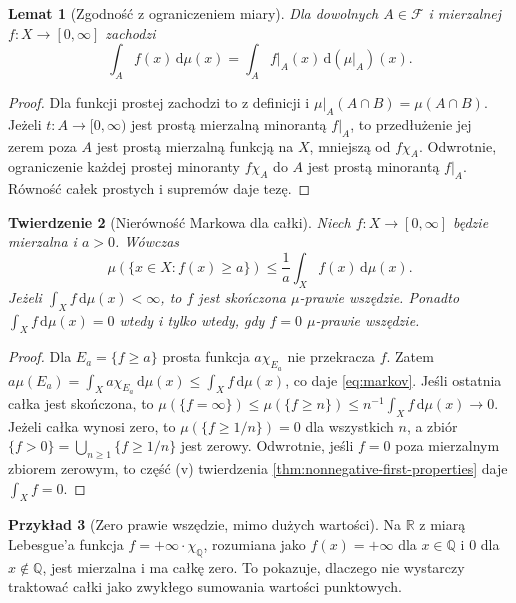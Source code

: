 \documentclass[11pt,a4paper,oneside]{book}
\numberwithin{equation}{chapter}
\theoremstyle{plain}
\newtheorem{twierdzenie}{Twierdzenie}[chapter]
\newtheorem{lemat}[twierdzenie]{Lemat}
\theoremstyle{definition}
\newtheorem{przyklad}[twierdzenie]{Przykład}
\theoremstyle{remark}
\begin{document}
\begin{lemat}[Zgodność z ograniczeniem miary]
\label{lem:restriction-integral}
Dla dowolnych $A\in\mathcal F$ i mierzalnej
$f:X\to[0,\infty]$ zachodzi
\[
\int_A f(x)\,\mathrm d\mu(x)
=\int_A f|_A(x)\,\mathrm d(\mu|_A)(x).
\]
\end{lemat}
\begin{proof}
Dla funkcji prostej zachodzi to z definicji i
$\mu|_A(A\cap B)=\mu(A\cap B)$.
Jeżeli $t:A\to[0,\infty)$ jest prostą mierzalną
minorantą $f|_A$, to przedłużenie jej zerem poza $A$
jest prostą mierzalną funkcją na $X$, mniejszą od
$f\chi_A$. Odwrotnie, ograniczenie każdej
prostej minoranty $f\chi_A$ do $A$ jest
prostą minorantą $f|_A$. Równość całek prostych
i supremów daje tezę.
\end{proof}

\begin{twierdzenie}[Nierówność Markowa dla całki]
\label{thm:markov-nonnegative}
Niech $f:X\to[0,\infty]$ będzie mierzalna i $a>0$.
Wówczas
\begin{equation}\label{eq:markov}
\mu(\{x\in X:f(x)\ge a\})
\le \frac1a\int_X f(x)\,\mathrm d\mu(x).
\end{equation}
Jeżeli $\int_Xf\,\mathrm d\mu(x)<\infty$, to $f$ jest
skończona $\mu$-prawie wszędzie. Ponadto
$\int_Xf\,\mathrm d\mu(x)=0$ wtedy i tylko wtedy,
gdy $f=0$ $\mu$-prawie wszędzie.
\end{twierdzenie}
\begin{proof}
Dla $E_a=\{f\ge a\}$ prosta funkcja
$a\chi_{E_a}$ nie przekracza $f$. Zatem
$a\mu(E_a)=\int_X a\chi_{E_a}\,\mathrm d\mu(x)
\le\int_Xf\,\mathrm d\mu(x)$, co daje
\eqref{eq:markov}. Jeśli ostatnia całka jest skończona,
to $\mu(\{f=\infty\})\le\mu(\{f\ge n\})
\le n^{-1}\int_Xf\,\mathrm d\mu(x)\to0$.
Jeżeli całka wynosi zero, to
$\mu(\{f\ge 1/n\})=0$ dla wszystkich $n$, a zbiór
$\{f>0\}=\bigcup_{n\ge1}\{f\ge1/n\}$ jest zerowy.
Odwrotnie, jeśli $f=0$ poza mierzalnym zbiorem zerowym,
to część (v) twierdzenia
\ref{thm:nonnegative-first-properties} daje $\int_X f=0$.
\end{proof}

\begin{przyklad}[Zero prawie wszędzie, mimo dużych wartości]
Na $\mathbb R$ z miarą Lebesgue'a funkcja
$f=+\infty\cdot\chi_{\mathbb Q}$, rozumiana jako
$f(x)=+\infty$ dla $x\in\mathbb Q$ i $0$ dla
$x\notin\mathbb Q$, jest mierzalna i ma całkę zero.
To pokazuje, dlaczego nie wystarczy traktować
całki jako zwykłego sumowania wartości punktowych.
\end{przyklad}
\end{document}
